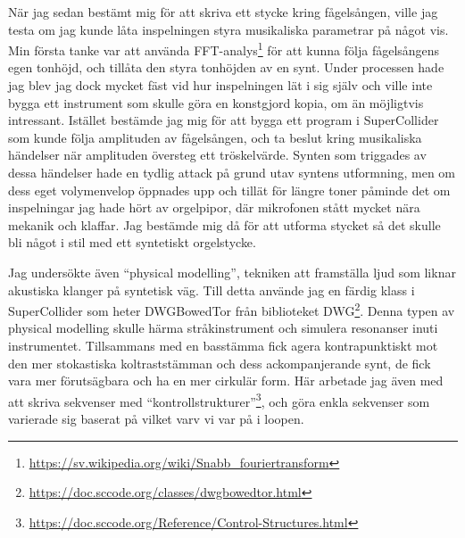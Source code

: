 \documentclass{article}
\begin{document}
När jag sedan bestämt mig för att skriva ett stycke kring fågelsången, ville jag
testa om jag kunde låta inspelningen styra musikaliska parametrar på något vis. Min första tanke var att
använda FFT-analys\footnote{\url{https://sv.wikipedia.org/wiki/Snabb\_fouriertransform}} för att kunna följa
fågelsångens egen tonhöjd, och tillåta den styra tonhöjden av en synt. Under processen hade jag blev jag dock
mycket fäst vid hur inspelningen lät i sig själv och ville inte bygga ett instrument som skulle göra en
konstgjord kopia, om än möjligtvis intressant. Istället bestämde jag mig för att bygga ett program i
SuperCollider som kunde följa amplituden av fågelsången, och ta beslut kring musikaliska händelser när
amplituden översteg ett tröskelvärde. Synten som triggades av dessa händelser hade en tydlig attack på grund
utav syntens utformning, men om dess eget volymenvelop öppnades upp och tillät för längre toner påminde det om
inspelningar jag hade hört av orgelpipor, där mikrofonen stått mycket nära mekanik och klaffar. 
Jag bestämde mig då för att utforma stycket så det skulle bli något i stil med ett syntetiskt orgelstycke.

Jag undersökte även ``physical modelling'', tekniken att framställa ljud som liknar akustiska klanger på
syntetisk väg. Till detta använde jag en färdig klass i SuperCollider som heter DWGBowedTor från biblioteket
DWG\footnote{\url{https://doc.sccode.org/classes/dwgbowedtor.html}}. Denna typen av physical modelling skulle
härma stråkinstrument och simulera resonanser inuti instrumentet. Tillsammans med en basstämma fick agera
kontrapunktiskt mot den mer stokastiska koltraststämman och dess ackompanjerande synt, de fick vara mer
förutsägbara och ha en mer cirkulär form. Här arbetade jag även med att skriva sekvenser med
``kontrollstrukturer''\footnote{\url{https://doc.sccode.org/Reference/Control-Structures.html}}, och göra
enkla sekvenser som varierade sig baserat på vilket varv vi var på i loopen.
\pagebreak
\end{document}
